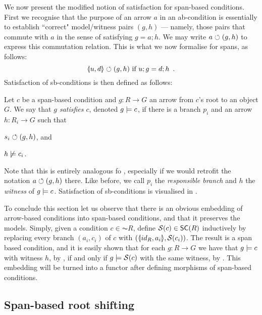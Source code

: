 We now present the modified notion of satisfaction for span-based conditions. First we recognise that the purpose of an arrow $a$ in an ab-condition is essentially to establish ``correct" model/witness pairs $(g,h)$ --- namely, those pairs that commute with $a$ in the sense of satisfying $g=a;h$. We may write $a\circlearrowleft (g,h)$ to express this commutation relation. This is what we now formalise for spans, as follows:
\[ \spanof u d \commutes (g,h) \text{ if } u;g=d;h \enspace. \]
Satisfaction of sb-conditions is then defined as follows:

\begin{definition}
  Let $c$ be a span-based condition and $g:R\to G$ an arrow from $c$'s root to an object $G$. We say that \emph{$g$ satisfies $c$}, denoted $g\models c$, if there is a branch $p_i$ and an arrow $h:R_i\to G$ such that
  \begin{enumerate*}
  \item $s_i \circlearrowleft (g, h)$, and
  \item $h\not\models c_i$.
  \end{enumerate*}
\end{definition}
%
Note that this is entirely analogous fo , especially if we would retrofit the notation $a\circlearrowleft (g,h)$ there. Like before, we call $p_i$ the \emph{responsible branch} and $h$ the \emph{witness} of $g\models c$. Satisfaction of sb-conditions is visualised in .

To conclude this section let us observe that there is an obvious embedding of arrow-based conditions into span-based conditions, and that it preserves the models. Simply, given a condition $c \in \AC {R}$, define $\cS(c)\in \SC R$ inductively by replacing every branch $(a_i,c_i)$ of $c$ with $(\spanof{id_R}{a_i},\cS(c_i))$. 
The result is a span based condition, and it is easily shown that for each $g:R \to G$ we have that $g \models c$ with witness $h$, by , if and only if $g \models \mathcal{S}(c)$ with the same witness, by . This embedding will be turned into a functor after defining morphisms of span-based conditions. 

\subsection{Span-based root shifting}

